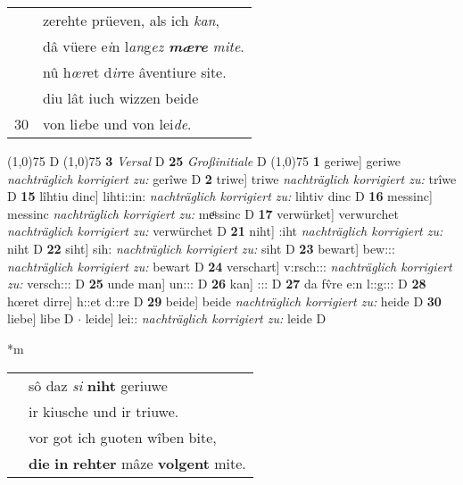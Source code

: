 \documentclass[8pt,a4paper,notitlepage]{article}
\begin{document}
\begin{table}[ht]
\begin{minipage}[t]{0.5\linewidth}
\begin{tabular}{rl}
 & zerehte prüeven, als ich \textit{kan},\\ 
 & dâ vüere e\textit{i}n l\textit{an}g\textit{ez \textbf{mære} mite}.\\ 
 & nû h\textit{œr}et d\textit{ir}re âventiure site.\\ 
 & diu lât iuch wizzen beide\\ 
30 & von li\textit{e}be und von lei\textit{de}.\\ 
\end{tabular}
\scriptsize
\line(1,0){75} \newline
D \newline
\line(1,0){75} \newline
\textbf{3} \textit{Versal} D  \textbf{25} \textit{Großinitiale} D  \newline
\line(1,0){75} \newline
\textbf{1} geriwe] geriwe \textit{nachträglich korrigiert zu:} gerîwe D \textbf{2} triwe] triwe \textit{nachträglich korrigiert zu:} trîwe D \textbf{15} lîhtiu dinc] lihti::in: \textit{nachträglich korrigiert zu:} lihtiv dinc D \textbf{16} messinc] messinc \textit{nachträglich korrigiert zu:} meͦssinc D \textbf{17} verwürket] verwurchet \textit{nachträglich korrigiert zu:} verwürchet D \textbf{21} niht] :iht \textit{nachträglich korrigiert zu:} niht D \textbf{22} siht] sih: \textit{nachträglich korrigiert zu:} siht D \textbf{23} bewart] bew::: \textit{nachträglich korrigiert zu:} bewart D \textbf{24} verschart] v:rsch::: \textit{nachträglich korrigiert zu:} versch::: D \textbf{25} unde man] un::: D \textbf{26} kan] ::: D \textbf{27} da fv̂re e:n l::g::: D \textbf{28} hœret dirre] h::et d::re D \textbf{29} beide] beide \textit{nachträglich korrigiert zu:} heide D \textbf{30} liebe] libe D  $\cdot$ leide] lei:: \textit{nachträglich korrigiert zu:} leide D \newline
\end{minipage}
\hspace{0.5cm}
\begin{minipage}[t]{0.5\linewidth}
\small
\begin{center}*m
\end{center}
\begin{tabular}{rl}
 & sô daz \textit{si} \textbf{niht} geriuwe\\ 
 & ir kiusche und ir triuwe.\\ 
 & vor got ich guoten wîben bite,\\ 
 & \textbf{die} \textbf{in} \textbf{rehter} mâze \textbf{volgent} mite.\\ 

\end{tabular}
\end{minipage}
\end{table}
\end{document}
